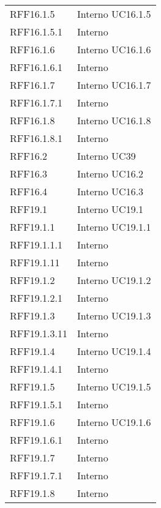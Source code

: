 \begin{longtable}{p{2.5cm}!{\VRule[1pt]}p{2.5cm}}
	RFF16.1.5 & Interno \newline UC16.1.5
	\\
	RFF16.1.5.1 & Interno \\
	RFF16.1.6 & Interno \newline UC16.1.6
	\\
	RFF16.1.6.1 & Interno \\
	RFF16.1.7 & Interno \newline UC16.1.7
	\\
	RFF16.1.7.1 & Interno \\
	RFF16.1.8 & Interno \newline UC16.1.8
	\\
	RFF16.1.8.1 & Interno \\
	RFF16.2 & Interno \newline UC39
	\\
	RFF16.3 & Interno \newline UC16.2
	\\
	RFF16.4 & Interno \newline UC16.3
	\\
	RFF19.1 & Interno \newline UC19.1
	\\
	RFF19.1.1 & Interno \newline UC19.1.1
	\\
	RFF19.1.1.1 & Interno \\
	RFF19.1.11 & Interno \\
	RFF19.1.2 & Interno \newline UC19.1.2
	\\
	RFF19.1.2.1 & Interno \\
	RFF19.1.3 & Interno \newline UC19.1.3
	\\
	RFF19.1.3.11 & Interno \\
	RFF19.1.4 & Interno \newline UC19.1.4
	\\
	RFF19.1.4.1 & Interno \\
	RFF19.1.5 & Interno \newline UC19.1.5
	\\
	RFF19.1.5.1 & Interno \\
	RFF19.1.6 & Interno \newline UC19.1.6
	\\
	RFF19.1.6.1 & Interno \\
	RFF19.1.7 & Interno \\
	RFF19.1.7.1 & Interno \\
	RFF19.1.8 & Interno \\

\end{longtable}
